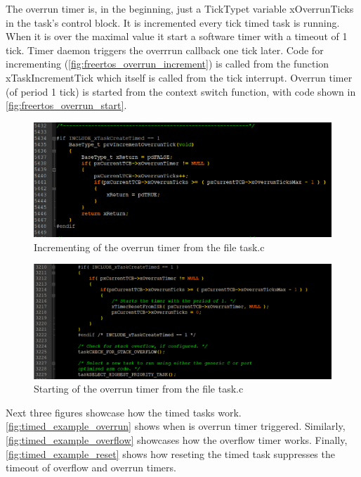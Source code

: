 The overrun timer is, in the beginning, just a TickType\textunderscore t variable xOverrunTicks in the task's control block. It is incremented every tick timed task is running. When it is over the maximal value it start a software timer with a timeout of 1 tick. Timer daemon triggers the overrrun callback one tick later. Code for incrementing (\autoref{fig:freertos_overrun_increment}) is called from the function xTaskIncrementTick which itself is called from the tick interrupt. Overrun timer (of period 1 tick) is started from the context switch function, with code shown in \autoref{fig:freertos_overrun_start}.

\begin{figure}[H]

      \centering
      \includegraphics[width=\linewidth]{images/freertos_overrrun_increment.png}
      \caption{Incrementing of the overrun timer from the file task.c}
      \label{fig:freertos_overrun_increment}
    
\end{figure}

\begin{figure}[H]

      \centering
      \includegraphics[width=\linewidth]{images/freertos_overrun_start.png}
      \caption{Starting of the overrun timer from the file task.c}
      \label{fig:freertos_overrun_start}
    
\end{figure}


 Next three figures showcase how the timed tasks work. \autoref{fig:timed_example_overrun} shows when is overrun timer triggered. Similarly, \autoref{fig:timed_example_overflow} showcases how the overflow timer works. Finally, \autoref{fig:timed_example_reset} shows how reseting the timed task suppresses the timeout of overflow and overrun timers.

